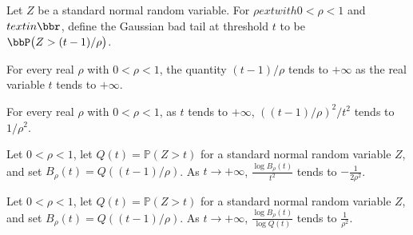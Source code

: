 \begin{definition}
\label{FABL.gaussianBadTailAtThreshold}
\leanok
{}
Let $Z$ be a standard normal random variable. For $\rho	ext{ with }0<\rho<1$ and $t	ext{
in }\bbr$, define the Gaussian bad tail at threshold $t$ to be
$\bbP\bigl(Z>(t-1)/\rho\bigr)$.
\end{definition}

\begin{theorem}
\label{FABL.tendsto_shift_div_correlation_atTop}
\leanok
{}
For every real $\rho$ with $0<\rho<1$, the quantity $(t-1)/\rho$ tends to $+\infty$ as
the real variable $t$ tends to $+\infty$.
\end{theorem}

\begin{theorem}
\label{FABL.tendsto_shift_div_correlation_sq_div_sq}
\leanok
{}
For every real $\rho$ with $0<\rho<1$, as $t$ tends to $+\infty$, $((t-1)/\rho)^2/t^2$
tends to $1/\rho^2$.
\end{theorem}

\begin{theorem}
\label{FABL.tendsto_log_gaussianBadTail_div_sq}
\leanok
{}
Let $0<\rho<1$, let $Q(t)=\mathbb{P}(Z>t)$ for a standard normal random variable $Z$,
and set $B_\rho(t)=Q((t-1)/\rho)$. As $t\to+\infty$, $\frac{\log B_\rho(t)}{t^2}$ tends
to $-\frac{1}{2\rho^2}$.
\end{theorem}

\begin{theorem}
\label{FABL.tendsto_log_gaussianBadTail_div_tailLog}
\leanok
{}
Let $0<\rho<1$, let $Q(t)=\mathbb{P}(Z>t)$ for a standard normal random variable $Z$,
and set $B_\rho(t)=Q((t-1)/\rho)$. As $t\to+\infty$, $\frac{\log B_\rho(t)}{\log Q(t)}$
tends to $\frac{1}{\rho^2}$.
\end{theorem}

